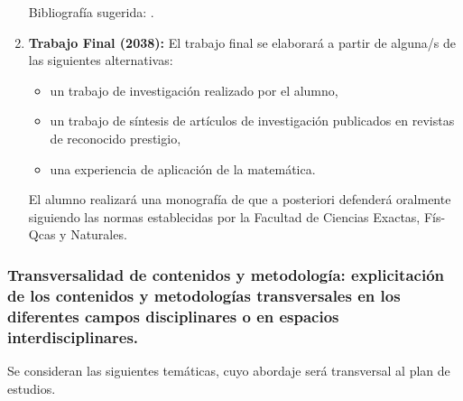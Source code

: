 \documentclass[a4paper, 12pt]{article}
\begin{document}
\begin{enumerate}
Bibliografía sugerida: \cite{HaimBrezis130,EmmanueleDibenedetto159,FrancisClarke335,JohnBConway489,MichelWillem870,WalterRudin1039, MischaCotlar1454}.

\item\textbf{Trabajo Final (2038):} El trabajo
final se elaborará a partir de alguna/s de las siguientes
alternativas:
\begin{itemize}
\item un trabajo de investigación realizado por el alumno,
\item un trabajo de síntesis de artículos de investigación publicados en
revistas de reconocido prestigio,
\item una experiencia de aplicación de la matemática.
\end{itemize}

El alumno realizará una monografía de  que a posteriori defenderá
oralmente siguiendo las normas establecidas por la Facultad de Ciencias Exactas, Fís-Qcas y Naturales.

\end{enumerate}






\subsubsection{Transversalidad de contenidos y metodología: explicitación de los contenidos y metodologías transversales en los diferentes campos disciplinares o en espacios interdisciplinares.}

Se consideran las siguientes temáticas, cuyo abordaje será transversal al plan de estudios. 
\end{document}

